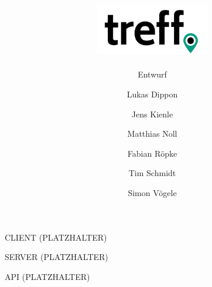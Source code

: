 \documentclass[aspectratio=1610]{beamer}
\title{\includegraphics[width = 50mm]{images/logo_crop.png}}
\subtitle{\huge Entwurf}
\author{Lukas Dippon
	\and Jens Kienle
	\and Matthias Noll
	\and Fabian Röpke
	\and Tim Schmidt
	\and Simon Vögele}
\begin{document}
	\begin{frame}[plain]
	\maketitle
	\end{frame}

	\begin{frame}[plain]
        CLIENT (PLATZHALTER)
	\end{frame}

	\begin{frame}[plain]
        SERVER (PLATZHALTER)
	\end{frame}

	\begin{frame}[plain]
        API (PLATZHALTER)
	\end{frame}
\end{document}
